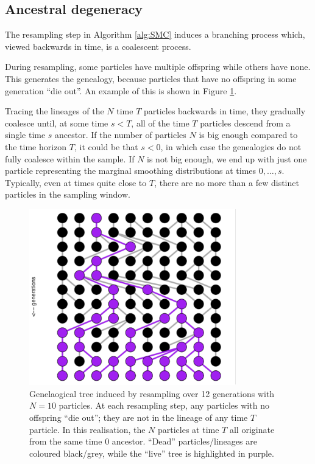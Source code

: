 \documentclass[fleqn]{article}
\theoremstyle{definition}
\begin{document}
\subsection{Ancestral degeneracy}
The resampling step in Algorithm \ref{alg:SMC} induces a branching process which, viewed backwards in time, is a coalescent process. 

During resampling, some particles have multiple offspring while others have none. This generates the  genealogy, because particles that have no offspring in some generation ``die out''.
An example of this is shown in Figure \ref{fig:WF_tree}.

Tracing the lineages of the $N$ time $T$ particles backwards in time, they gradually coalesce until, at some time $s<T$, all of the time $T$ particles descend from a single time $s$ ancestor. 
If the number of particles $N$ is big enough compared to the time horizon $T$, it could be that $s<0$, in which case the genealogies do not fully coalesce within the sample. If $N$ is not big enough, we end up with just one particle representing the marginal smoothing distributions at times $0,\dots,s$.
Typically, even at times quite close to $T$, there are no more than a few distinct particles in the sampling window.

\begin{figure}
\centering
\includegraphics[width=0.8\textwidth]{eg_WF.pdf}
\caption{Genelaogical tree induced by resampling over 12 generations with $N=10$ particles. At each resampling step, any particles with no offspring ``die out''; they are not in the lineage of any time $T$ particle. In this realisation, the $N$ particles at time $T$ all originate from the same time $0$ ancestor. ``Dead'' particles/lineages are coloured black/grey, while the ``live'' tree is highlighted in purple.}
\label{fig:WF_tree}
\end{figure}
\end{document}
